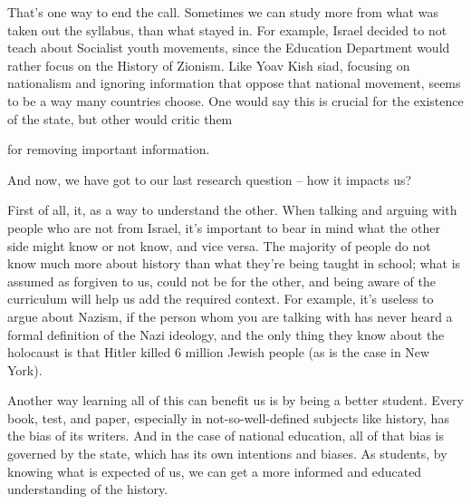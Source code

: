 \documentclass[]{../../../../tex/classes/styledArticle}
\begin{document}
	
	That's one way to end the call. Sometimes we can study more from what was taken out the syllabus, than what stayed in. For example, Israel decided to not teach about Socialist youth movements, since the Education Department would rather focus on the History of Zionism. Like Yoav Kish siad, focusing on nationalism and ignoring information that oppose that national movement, seems to be a way many countries choose. One would say this is crucial for the existence of the state, but other would critic them 
	
	for removing important information. 
	
	And now, we have got to our last research question -- how it impacts us? 
	
	First of all, it, as a way to understand the other. When talking and arguing with people who are not from Israel, it's important to bear in mind what the other side might know or not know, and vice versa. The majority of people do not know much more about history than what they're being taught in school; what is assumed as forgiven to us, could not be for the other, and being aware of the curriculum will help us add the required context. For example, it's useless to argue about Nazism, if the person whom you are talking with has never heard a formal definition of the Nazi ideology, and the only thing they know about the holocaust is that Hitler killed 6 million Jewish people (as is the case in New York). 
	
	Another way learning all of this can benefit us is by being a better student. Every book, test, and paper, especially in not-so-well-defined subjects like history, has the bias of its writers. And in the case of national education, all of that bias is governed by the state, which has its own intentions and biases. As students, by knowing what is expected of us, we can get a more informed and educated understanding of the history. 
	
\end{document}
